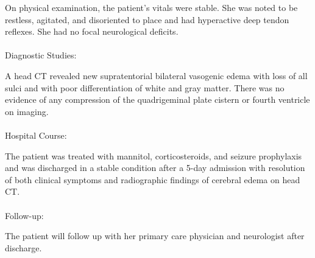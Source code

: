 On physical examination, the patient's vitals were stable. She was noted to be restless, agitated, and disoriented to place and had hyperactive deep tendon reflexes. She had no focal neurological deficits.
\\\\Diagnostic Studies:

A head CT revealed new supratentorial bilateral vasogenic edema with loss of all sulci and with poor differentiation of white and gray matter. There was no evidence of any compression of the quadrigeminal plate cistern or fourth ventricle on imaging.
\\\\Hospital Course:

The patient was treated with mannitol, corticosteroids, and seizure prophylaxis and was discharged in a stable condition after a 5-day admission with resolution of both clinical symptoms and radiographic findings of cerebral edema on head CT.
\\\\Follow-up:

The patient will follow up with her primary care physician and neurologist after discharge.